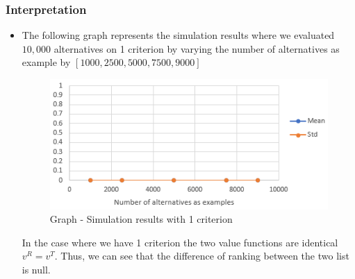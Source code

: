 \documentclass{report}
\begin{document}
\subsubsection{Interpretation}
\begin{itemize}
\item The following graph represents the simulation results where we evaluated $10,000$ alternatives on 1 criterion by varying the number of alternatives as example by $[1000, 2500, 5000, 7500, 9000]$ 
\begin{figure}[H]
\centering
\includegraphics[keepaspectratio]{graph-01.PNG}
\caption{Graph - Simulation results with 1 criterion}
\end{figure}
In the case where we have 1 criterion the two value functions are identical $v^R = v^T$. Thus, we can see that the difference of ranking between the two list is null.\\


\end{itemize}
\end{document}

